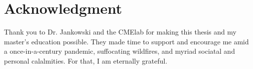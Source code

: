 \chapter*{Acknowledgment}

Thank you to Dr. Jankowski and the CMElab for making this thesis and my master's education possible. They made
time to support and encourage me amid a once-in-a-century pandemic, suffocating wildfires, and myriad
sociatal and personal calalmities. For that, I am eternally grateful.
